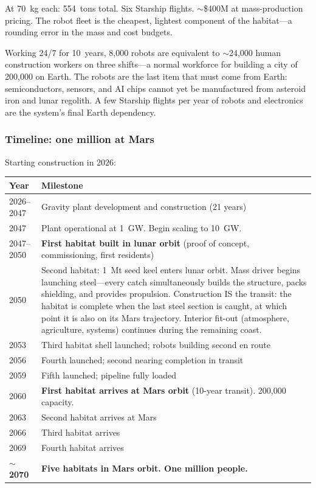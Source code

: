 \documentclass[12pt,letterpaper]{article}
\begin{document}
At 70~kg each: 554~tons total. Six Starship flights. $\sim$\$400M at mass-production pricing. The robot fleet is the cheapest, lightest component of the habitat---a rounding error in the mass and cost budgets.

Working 24/7 for 10~years, 8,000 robots are equivalent to $\sim$24,000 human construction workers on three shifts---a normal workforce for building a city of 200,000 on Earth. The robots are the last item that must come from Earth: semiconductors, sensors, and AI chips cannot yet be manufactured from asteroid iron and lunar regolith. A few Starship flights per year of robots and electronics are the system's final Earth dependency.

\subsubsection{Timeline: one million at Mars}

Starting construction in 2026:

\begin{center}
\small
\begin{tabular}{lp{10cm}}
\toprule
\textbf{Year} & \textbf{Milestone} \\
\midrule
2026--2047 & Gravity plant development and construction (21 years) \\
2047 & Plant operational at 1~GW. Begin scaling to 10~GW. \\
2047--2050 & \textbf{First habitat built in lunar orbit} (proof of concept, commissioning, first residents) \\
2050 & Second habitat: 1~Mt seed keel enters lunar orbit. Mass driver begins launching steel---every catch simultaneously builds the structure, packs shielding, and provides propulsion. Construction IS the transit: the habitat is complete when the last steel section is caught, at which point it is also on its Mars trajectory. Interior fit-out (atmosphere, agriculture, systems) continues during the remaining coast. \\
2053 & Third habitat shell launched; robots building second en route \\
2056 & Fourth launched; second nearing completion in transit \\
2059 & Fifth launched; pipeline fully loaded \\
2060 & \textbf{First habitat arrives at Mars orbit} (10-year transit). 200,000 capacity. \\
2063 & Second habitat arrives at Mars \\
2066 & Third habitat arrives \\
2069 & Fourth habitat arrives \\
$\sim$\textbf{2070} & \textbf{Five habitats in Mars orbit. One million people.} \\
\bottomrule
\end{tabular}
\end{center}
\end{document}
